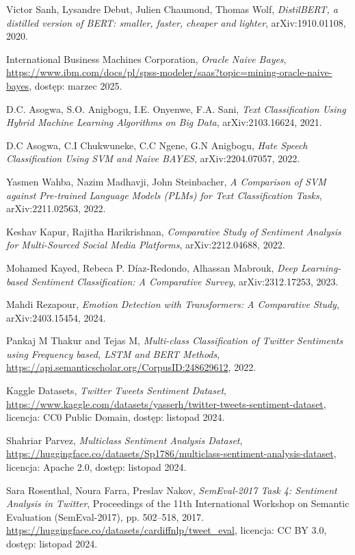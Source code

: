 Victor Sanh, Lysandre Debut, Julien Chaumond, Thomas Wolf,
\textit{DistilBERT, a distilled version of BERT: smaller, faster, cheaper and lighter},
arXiv:1910.01108, 2020.

International Business Machines Corporation,
\textit{Oracle Naive Bayes},
\url{https://www.ibm.com/docs/pl/spss-modeler/saas?topic=mining-oracle-naive-bayes}, dostęp: marzec 2025.

D.C. Asogwa, S.O. Anigbogu, I.E. Onyenwe, F.A. Sani,
\textit{Text Classification Using Hybrid Machine Learning Algorithms on Big Data},
arXiv:2103.16624, 2021.

D.C Asogwa, C.I Chukwuneke, C.C Ngene, G.N Anigbogu,
\textit{Hate Speech Classification Using SVM and Naive BAYES},
arXiv:2204.07057, 2022.

Yasmen Wahba, Nazim Madhavji, John Steinbacher,
\textit{A Comparison of SVM against Pre-trained Language Models (PLMs) for Text Classification Tasks},
arXiv:2211.02563, 2022.

Keshav Kapur, Rajitha Harikrishnan,
\textit{Comparative Study of Sentiment Analysis for Multi-Sourced Social Media Platforms},
arXiv:2212.04688, 2022.

Mohamed Kayed, Rebeca P. Díaz-Redondo, Alhassan Mabrouk,
\textit{Deep Learning-based Sentiment Classification: A Comparative Survey},
arXiv:2312.17253, 2023.

Mahdi Rezapour,
\textit{Emotion Detection with Transformers: A Comparative Study},
arXiv:2403.15454, 2024.

Pankaj M Thakur and Tejas M,
\textit{Multi-class Classification of Twitter Sentiments using Frequency based, LSTM and BERT Methods},
\url{https://api.semanticscholar.org/CorpusID:248629612}, 2022.

Kaggle Datasets,
\textit{Twitter Tweets Sentiment Dataset},
\url{https://www.kaggle.com/datasets/yasserh/twitter-tweets-sentiment-dataset}, licencja: CC0 Public Domain, dostęp: listopad 2024.

Shahriar Parvez,  
\textit{Multiclass Sentiment Analysis Dataset},  
\url{https://huggingface.co/datasets/Sp1786/multiclass-sentiment-analysis-dataset}, licencja: Apache 2.0, dostęp: listopad 2024.

Sara Rosenthal, Noura Farra, Preslav Nakov,
\textit{SemEval-2017 Task 4: Sentiment Analysis in Twitter},
Proceedings of the 11th International Workshop on Semantic Evaluation (SemEval-2017), pp. 502--518, 2017.
\url{https://huggingface.co/datasets/cardiffnlp/tweet_eval}, licencja: CC BY 3.0, dostęp: listopad 2024.

